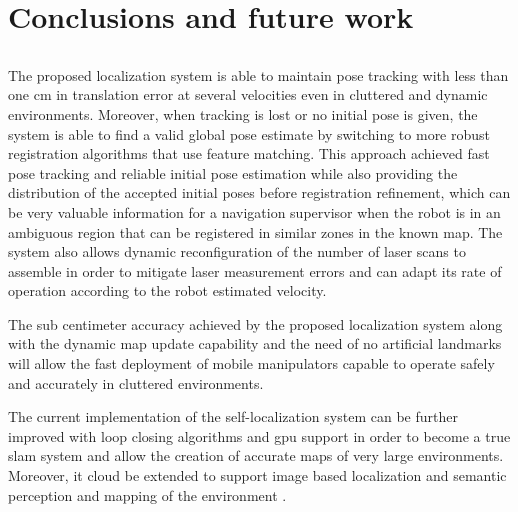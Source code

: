 \chapter{Conclusions and future work} \label{chap:conclusions-and-future-work}



\section*{}

The proposed localization system is able to maintain pose tracking with less than one cm in translation error at several velocities even in cluttered and dynamic environments. Moreover, when tracking is lost or no initial pose is given, the system is able to find a valid global pose estimate by switching to more robust registration algorithms that use feature matching. This approach achieved fast pose tracking and reliable initial pose estimation while also providing the distribution of the accepted initial poses before registration refinement, which can be very valuable information for a navigation supervisor when the robot is in an ambiguous region that can be registered in similar zones in the known map. The system also allows dynamic reconfiguration of the number of laser scans to assemble in order to mitigate laser measurement errors and can adapt its rate of operation according to the robot estimated velocity.

The sub centimeter accuracy achieved by the proposed localization system along with the dynamic map update capability and the need of no artificial landmarks will allow the fast deployment of mobile manipulators capable to operate safely and accurately in cluttered environments.


The current implementation of the self-localization system can be further improved with loop closing algorithms \cite{Grisetti2012} and \gls{gpu} support \cite{Tamaki2010} in order to become a true \gls{slam} system and allow the creation of accurate maps of very large environments. Moreover, it cloud be extended to support image based localization \cite{Labb2014} and semantic perception \cite{Rusu2010a} and mapping of the environment \cite{Santos2013}.
